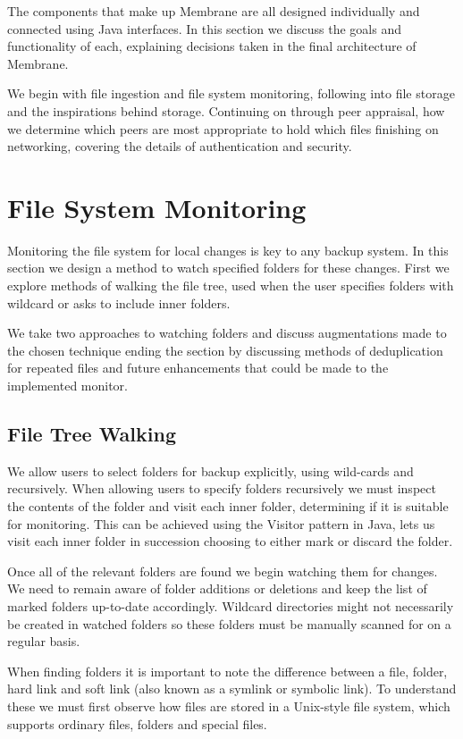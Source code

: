 \documentclass[11pt, a4paper, twocolumn, twoside]{report}
\begin{document}
The components that make up Membrane are all designed individually and connected using Java interfaces. In this section we discuss the goals and functionality of each, explaining decisions taken in the final architecture of Membrane.

We begin with file ingestion and file system monitoring, following into file storage and the inspirations behind storage. Continuing on through peer appraisal, how we determine which peers are most appropriate to hold which files finishing on networking, covering the details of authentication and security.

\section{File System Monitoring}

Monitoring the file system for local changes is key to any backup system. In this section we design a method to watch specified folders for these changes. First we explore methods of walking the file tree, used when the user specifies folders with wildcard or asks to include inner folders.

We take two approaches to watching folders and discuss augmentations made to the chosen technique ending the section by discussing methods of deduplication for repeated files and future enhancements that could be made to the implemented monitor.

\subsection{File Tree Walking}

We allow users to select folders for backup explicitly, using wild-cards and recursively. When allowing users to specify folders recursively we must inspect the contents of the folder and visit each inner folder, determining if it is suitable for monitoring. This can be achieved using the Visitor pattern in Java, lets us visit each inner folder in succession choosing to either mark or discard the folder. \citep{sugrue2010visitor}

Once all of the relevant folders are found we begin watching them for changes. We need to remain aware of folder additions or deletions and keep the list of marked folders up-to-date accordingly. Wildcard directories might not necessarily be created in watched folders so these folders must be manually scanned for on a regular basis.

When finding folders it is important to note the difference between a file, folder, hard link and soft link (also known as a symlink or symbolic link). To understand these we must first observe how files are stored in a Unix-style file system, which supports ordinary files, folders and special files.
\end{document}
